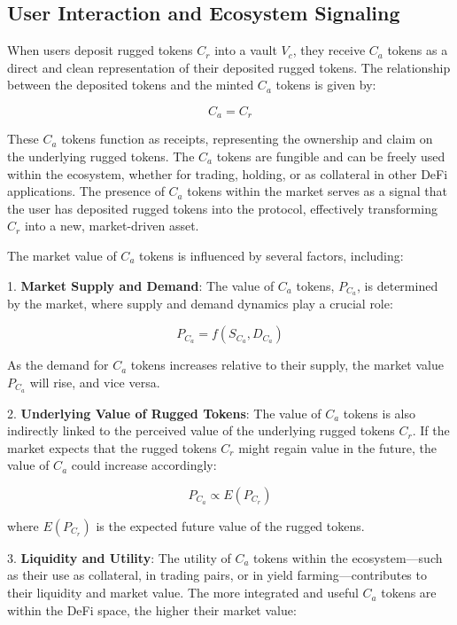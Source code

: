 \documentclass{article}
\begin{document}




\subsection{User Interaction and Ecosystem Signaling}
When users deposit rugged tokens $C_r$ into a vault $V_c$, they receive $C_a$ tokens as a direct and clean representation of their deposited rugged tokens. The relationship between the deposited tokens and the minted $C_a$ tokens is given by:

\[
C_a = C_r
\]

These $C_a$ tokens function as receipts, representing the ownership and claim on the underlying rugged tokens. The $C_a$ tokens are fungible and can be freely used within the ecosystem, whether for trading, holding, or as collateral in other DeFi applications. The presence of $C_a$ tokens within the market serves as a signal that the user has deposited rugged tokens into the protocol, effectively transforming $C_r$ into a new, market-driven asset.

The market value of $C_a$ tokens is influenced by several factors, including:

1. \textbf{Market Supply and Demand}: The value of $C_a$ tokens, $P_{C_a}$, is determined by the market, where supply and demand dynamics play a crucial role:

\[
P_{C_a} = f(S_{C_a}, D_{C_a})
\]

As the demand for $C_a$ tokens increases relative to their supply, the market value $P_{C_a}$ will rise, and vice versa.

2. \textbf{Underlying Value of Rugged Tokens}: The value of $C_a$ tokens is also indirectly linked to the perceived value of the underlying rugged tokens $C_r$. If the market expects that the rugged tokens $C_r$ might regain value in the future, the value of $C_a$ could increase accordingly:

\[
P_{C_a} \propto E(P_{C_r})
\]

where $E(P_{C_r})$ is the expected future value of the rugged tokens.

3. \textbf{Liquidity and Utility}: The utility of $C_a$ tokens within the ecosystem—such as their use as collateral, in trading pairs, or in yield farming—contributes to their liquidity and market value. The more integrated and useful $C_a$ tokens are within the DeFi space, the higher their market value:
\end{document}
